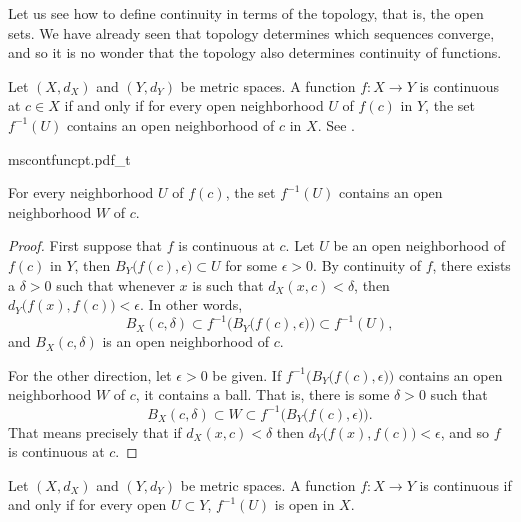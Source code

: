 Let us see how to define continuity in terms of the topology, that is,
the open sets.  We have already seen that topology determines which 
sequences converge, and so it is no wonder that the topology also
determines continuity of functions.

\begin{lemma} \label{lemma:mstopocontloc}
Let $(X,d_X)$ and $(Y,d_Y)$ be metric spaces.
A function $f \colon X \to Y$ is continuous at $c \in X$
if and only if for every open neighborhood $U$ of $f(c)$ in $Y$, the set
$f^{-1}(U)$ contains an open neighborhood of $c$ in $X$.
See .
\end{lemma}

\begin{myfigureht}
{mscontfuncpt.pdf_t}
\caption{For every neighborhood $U$ of $f(c)$, the set $f^{-1}(U)$ contains an open
neighborhood $W$ of $c$.\label{fig:mscontfuncpt}}
\end{myfigureht}

\begin{proof}
First suppose that $f$ is continuous at $c$.
Let $U$ be an open neighborhood of $f(c)$
in $Y$, then $B_Y\bigl(f(c),\epsilon\bigr) \subset U$ for some $\epsilon >
0$.  By continuity of $f$, there exists a $\delta > 0$
such that whenever $x$ is such that $d_X(x,c) < \delta$, then
$d_Y\bigl(f(x),f(c)\bigr) < \epsilon$.  In other words,
\begin{equation*}
B_X(c,\delta) \subset f^{-1}\bigl(B_Y\bigl(f(c),\epsilon\bigr)\bigr) \subset
f^{-1}(U) ,
\end{equation*}
and $B_X(c,\delta)$ is an open neighborhood of $c$.

For the other direction,
let $\epsilon > 0$ be given.  If
$f^{-1}\bigl(B_Y\bigl(f(c),\epsilon\bigr)\bigr)$ contains an open
neighborhood $W$ of $c$, it contains a ball.  That is, there is some $\delta > 0$
such that
\begin{equation*}
B_X(c,\delta) \subset W \subset f^{-1}\bigl(B_Y\bigl(f(c),\epsilon\bigr)\bigr) .
\end{equation*}
That means precisely that if $d_X(x,c) < \delta$ then $d_Y\bigl(f(x),f(c)\bigr)
< \epsilon$, and so $f$ is continuous at $c$.
\end{proof}

\begin{thm} \label{thm:mstopocont}
Let $(X,d_X)$ and $(Y,d_Y)$ be metric spaces.  A function $f \colon X \to Y$
is continuous if and only if
for every open $U \subset Y$, $f^{-1}(U)$ is open in $X$.
\end{thm}

